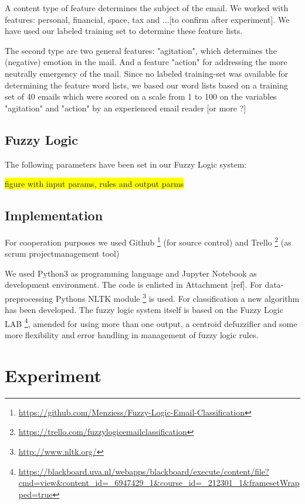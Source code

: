 \documentclass[journal]{IEEEtran}
\begin{document}
    A content type of feature determines the subject of the email. We worked with features: personal, financial, space, tax and ...[to confirm after experiment]. We have used our labeled training set to determine these feature lists. 
    
    The second type are two general features: "agitation", which determines the (negative) emotion in the mail. And a feature "action" for addressing the more neutrally emergency of the mail. Since no labeled training-set was available for determining the feature word lists, we based our word lists based on a training set of 40 emails which were scored on a scale from 1 to 100 on the variables "agitation" and "action" by an experienced email reader [or more ?]  
    
\subsection{Fuzzy Logic}
    
    The following parameters have been set in our Fuzzy Logic system: 
    
\colorbox{yellow}{figure with input params, rules and output parms}

\subsection{Implementation}
For cooperation purposes we used Github \footnote{\url{https://github.com/Menziess/Fuzzy-Logic-Email-Classification}} (for source control) and Trello \footnote{\url{https://trello.com/fuzzylogicemailclassification}} (as scrum projectmanagement tool)

We used Python3 as programming language and Jupyter Notebook as development 
environment. The code is enlisted in Attachment [ref]. For data-preprocessing Pythons NLTK module \footnote{\url{http://www.nltk.org/}} is used. For classification a new algorithm has been developed. The fuzzy logic system itself is based on the Fuzzy Logic LAB \footnote{\url{https://blackboard.uva.nl/webapps/blackboard/execute/content/file?cmd=view&content_id=_6947429_1&course_id=_212301_1&framesetWrapped=true}}, amended for using more than one output, a centroid defuzzifier and some more flexibility and error handling in management of fuzzy logic rules. 
    
\section{Experiment}
\end{document}
